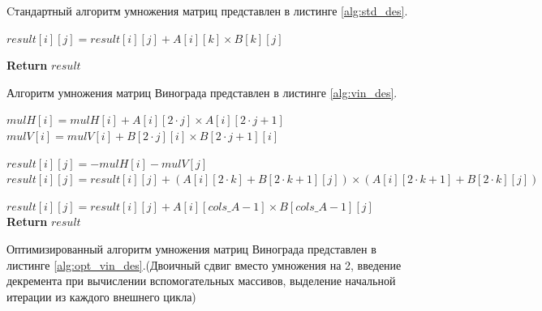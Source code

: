 Cтандартный алгоритм умножения матриц представлен в листинге \ref{alg:std_des}.

\begin{algorithm}[H]
\caption{Cтандартный алгоритм умножения матриц}
\label{alg:std_des}
\begin{algorithmic}
                \State $result[i][j] = result[i][j] + A[i][k] \times B[k][j]$
            \EndFor
        \EndFor
    \EndFor
    
    \State \textbf{Return} $result$
\end{algorithmic}
\end{algorithm}

Алгоритм умножения матриц Винограда представлен в листинге \ref{alg:vin_des}.

\begin{algorithm}[H]
\caption{Алгоритм умножения матриц Винограда}
\label{alg:vin_des}
\begin{algorithmic}
            \State $mulH[i] = mulH[i] + A[i][2 \cdot j] \times A[i][2 \cdot j + 1]$
        \EndFor
    \EndFor
            \State $mulV[i] = mulV[i] + B[2 \cdot j][i] \times B[2 \cdot j + 1][i]$
        \EndFor
    \EndFor
    
            \State $result[i][j] = -mulH[i] - mulV[j]$
                \State $result[i][j] = result[i][j] + (A[i][2 \cdot k] + B[2 \cdot k + 1][j]) \times (A[i][2 \cdot k + 1] + B[2 \cdot k][j])$
            \EndFor
        \EndFor
    \EndFor
    
                \State $result[i][j] = result[i][j] + A[i][cols\_A - 1] \times B[cols\_A - 1][j]$
            \EndFor
        \EndFor
    \EndIf
    \State \textbf{Return} $result$
\end{algorithmic}
\end{algorithm}

Оптимизированный алгоритм умножения матриц Винограда представлен в листинге \ref{alg:opt_vin_des}.(Двоичный сдвиг вместо умножения на 2, введение декремента при вычислении вспомогательных массивов, выделение начальной итерации из каждого внешнего цикла)

